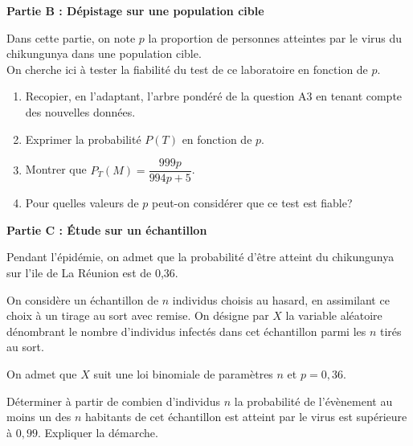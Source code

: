 \textbf{Partie B : Dépistage sur une population cible}

\medskip

Dans cette partie, on note $p$ la proportion de personnes atteintes par le virus du chikungunya dans une population cible.\\
On cherche ici à tester la fiabilité du test de ce laboratoire en fonction de $p$.

\begin{enumerate}
\item Recopier, en l'adaptant, l'arbre pondéré de la question A3 en tenant compte des nouvelles données.
\item Exprimer la probabilité $P(T)$ en fonction de $p$.
\item Montrer que $P_{T}(M) = \dfrac{999 p}{994 p+5}$.
\item Pour quelles valeurs de $p$ peut-on considérer que ce test est fiable?
\end{enumerate}

\textbf{Partie C : Étude sur un échantillon}

\medskip

Pendant l'épidémie, on admet que la probabilité d'être atteint du chikungunya sur l'ile de La Réunion est de 0,36.

On considère un échantillon de $n$ individus choisis au hasard, en assimilant ce choix à un tirage au sort avec remise. On désigne par $X$ la variable aléatoire dénombrant le nombre d'individus infectés dans cet échantillon parmi les $n$ tirés au sort.

On admet que $X$ suit une loi binomiale de paramètres $n$ et $p=0,36$.


Déterminer à partir de combien d'individus $n$ la probabilité de l'évènement \og au moins un des $n$ habitants de cet échantillon est atteint par le virus \fg est supérieure à $0,99$. Expliquer la démarche.

\bigskip

